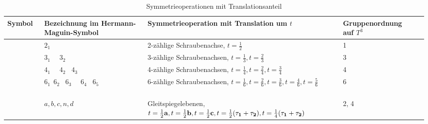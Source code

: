 \begin{table}[]
	\caption{Symmetrieoperationen mit Translationsanteil}
	\begin{tabular}{C{1.5cm}C{3cm}C{5cm}C{3cm}c}
		\toprule
		Symbol                                                       & Bezeichnung im Hermann-Maguin-Symbol       & Symmetrieoperation mit Translation um $t$                                                                                                                                                                       & Gruppenordnung auf $T^3$ & \\
		\midrule
		                                                     & $2_1$                                      & 2-zählige Schraubenachse, $t=\frac{1}{2}$                                                                                                                                                                       & 1                      &  \\
		 \ \                                         & $3_1$ \ \  $3_2$                           & 3-zählige Schraubenachsen, $t=\frac{1}{3}, t=\frac{2}{3}$                                                                                                                                                       & 3                       & \\
		\ \   \ \                            & $4_1$ \ \ $4_2$ \ \newline $4_3$                  & 4-zählige Schraubenachsen, $t=\frac{1}{4}, t=\frac{2}{4}, t=\frac{3}{4}$                                                                                                                                        & 4                        & \\
		 \ \  \ \  \ \  \ \  & $6_1 \ \ 6_2$ \ \newline $6_3$ \ \ $6_4$ \ \newline $6_5$ & 6-zählige Schraubenachsen, $t=\frac{1}{6}, t=\frac{2}{6}, t=\frac{3}{6},$\newline$ t=\frac{4}{6}, t=\frac{5}{6}$                                                                                                          & 6                       & \\
		                                                      & $a, b, c, n, d$                            &  Gleitspiegelebenen, $t=\frac{1}{2}\mathbf{a}, t=\frac{1}{2}\mathbf{b}, t=\frac{1}{2}\mathbf{c}, t=\frac{1}{2}(\mathbf{\tau_1}+\mathbf{\tau_2}), t=\frac{1}{4}(\mathbf{\tau_1} +\mathbf{\tau_2}) $ & 2, 4 & \\                  
		\bottomrule
	\end{tabular}
\end{table}


